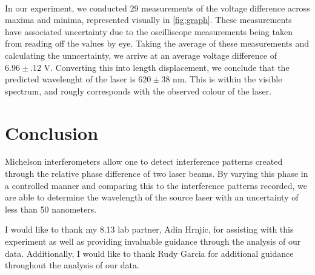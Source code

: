     \\
    In our experiment, we conducted 29 measurements of the voltage difference across maxima and minima, represented visually in \ref{fig:graph}. These measurements have associated uncertainty due to the oscilliscope measurements being taken from reading off the values by eye. Taking the average of these measurements and calculating the unncertainty, we arrive at an average voltage difference of $6.96 \pm .12 $ V. Converting this into length displacement, we conclude that the predicted wavelenght of the laser is $620 \pm 38$ nm. This is within the visible spectrum, and rougly corresponds with the observed colour of the laser.
    \section{Conclusion}
    Michelson interferometers allow one to detect interference patterns created through the relative phase difference of two laser beams. By varying this phase in a controlled manner and comparing this to the interference patterns recorded, we are able to determine the wavelength of the source laser with an uncertainty of less than 50 nanometers. 
    \begin{acknowledgements}
    I would like to thank my 8.13 lab partner, Adin Hrnjic, for assisting with this experiment as well as providing invaluable guidance through the analysis of our data. Additionally, I would like to thank Rudy Garcia for additional guidance throughout the analysis of our data.
  \end{acknowledgements}
  \lipsum

  



